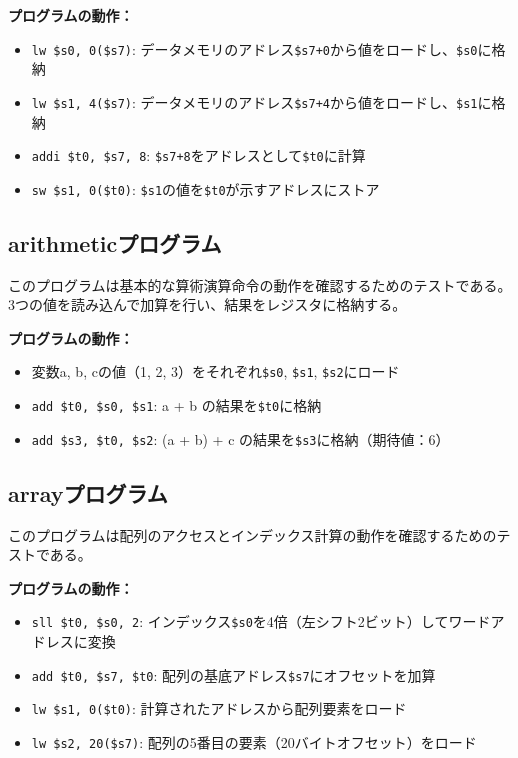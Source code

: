 \documentclass[dvipdfmx]{jsarticle}
\begin{document}
\textbf{プログラムの動作：}
\begin{itemize}
\item \texttt{lw \$s0, 0(\$s7)}: データメモリのアドレス\texttt{\$s7+0}から値をロードし、\texttt{\$s0}に格納
\item \texttt{lw \$s1, 4(\$s7)}: データメモリのアドレス\texttt{\$s7+4}から値をロードし、\texttt{\$s1}に格納  
\item \texttt{addi \$t0, \$s7, 8}: \texttt{\$s7+8}をアドレスとして\texttt{\$t0}に計算
\item \texttt{sw \$s1, 0(\$t0)}: \texttt{\$s1}の値を\texttt{\$t0}が示すアドレスにストア
\end{itemize}

\subsection{arithmeticプログラム}
\label{appendix:arithmetic_asm}
このプログラムは基本的な算術演算命令の動作を確認するためのテストである。
3つの値を読み込んで加算を行い、結果をレジスタに格納する。



\textbf{プログラムの動作：}
\begin{itemize}
\item 変数a, b, cの値（1, 2, 3）をそれぞれ\texttt{\$s0}, \texttt{\$s1}, \texttt{\$s2}にロード
\item \texttt{add \$t0, \$s0, \$s1}: a + b の結果を\texttt{\$t0}に格納
\item \texttt{add \$s3, \$t0, \$s2}: (a + b) + c の結果を\texttt{\$s3}に格納（期待値：6）
\end{itemize}

\subsection{arrayプログラム}
\label{appendix:array_asm}
このプログラムは配列のアクセスとインデックス計算の動作を確認するためのテストである。



\textbf{プログラムの動作：}
\begin{itemize}
\item \texttt{sll \$t0, \$s0, 2}: インデックス\texttt{\$s0}を4倍（左シフト2ビット）してワードアドレスに変換
\item \texttt{add \$t0, \$s7, \$t0}: 配列の基底アドレス\texttt{\$s7}にオフセットを加算
\item \texttt{lw \$s1, 0(\$t0)}: 計算されたアドレスから配列要素をロード
\item \texttt{lw \$s2, 20(\$s7)}: 配列の5番目の要素（20バイトオフセット）をロード
\end{itemize}
\end{document}
